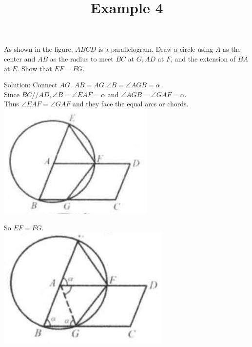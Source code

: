\documentclass{article}
\title{Example 4}
\date{}
\begin{document}
\maketitle

As shown in the figure, \(A B C D\) is a parallelogram. Draw a circle using \(A\) as the center and \(A B\) as the radius to meet \(B C\) at \(G, A D\) at \(F\), and the extension of \(B A\) at \(E\). Show that \(E F=F G\).

Solution:
Connect \(A G\). \(A B=A G . \angle B=\angle A G B=\alpha\).\\
Since \(B C / / A D, \angle B=\angle E A F=\alpha\) and \(\angle A G B=\angle G A F=\alpha\).\\
Thus \(\angle E A F=\angle G A F\) and they face the equal arcs or chords.\\
\centering
\includegraphics[width=\textwidth]{images/problem_image_1.jpg}

So \(E F=F G\).\\
\centering
\includegraphics[width=\textwidth]{images/reasoning_image_1.jpg}
\end{document}
